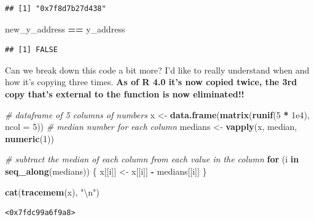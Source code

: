 \documentclass[]{book}
\newenvironment{Shaded}{\begin{snugshade}}{\end{snugshade}}
\newcommand{\CharTok}[1]{\textcolor[rgb]{0.31,0.60,0.02}{#1}}
\newcommand{\CommentTok}[1]{\textcolor[rgb]{0.56,0.35,0.01}{\textit{#1}}}
\newcommand{\ControlFlowTok}[1]{\textcolor[rgb]{0.13,0.29,0.53}{\textbf{#1}}}
\newcommand{\DataTypeTok}[1]{\textcolor[rgb]{0.13,0.29,0.53}{#1}}
\newcommand{\DecValTok}[1]{\textcolor[rgb]{0.00,0.00,0.81}{#1}}
\newcommand{\FloatTok}[1]{\textcolor[rgb]{0.00,0.00,0.81}{#1}}
\newcommand{\KeywordTok}[1]{\textcolor[rgb]{0.13,0.29,0.53}{\textbf{#1}}}
\newcommand{\NormalTok}[1]{#1}
\newcommand{\OperatorTok}[1]{\textcolor[rgb]{0.81,0.36,0.00}{\textbf{#1}}}
\newcommand{\StringTok}[1]{\textcolor[rgb]{0.31,0.60,0.02}{#1}}
\begin{document}
\begin{verbatim}
## [1] "0x7f8d7b27d438"
\end{verbatim}

\begin{Shaded}
\begin{Highlighting}[]
\NormalTok{new_y_address }\OperatorTok{==}\StringTok{ }\NormalTok{y_address}
\end{Highlighting}
\end{Shaded}

\begin{verbatim}
## [1] FALSE
\end{verbatim}

Can we break down this code a bit more? I'd like to really understand when and how it's copying three times. \textbf{As of R 4.0 it's now copied twice, the 3rd copy that's external to the function is now eliminated!!}

\begin{Shaded}
\begin{Highlighting}[]
\CommentTok{# dataframe of 5 columns of numbers}
\NormalTok{x <-}\StringTok{ }\KeywordTok{data.frame}\NormalTok{(}\KeywordTok{matrix}\NormalTok{(}\KeywordTok{runif}\NormalTok{(}\DecValTok{5} \OperatorTok{*}\StringTok{ }\FloatTok{1e4}\NormalTok{), }\DataTypeTok{ncol =} \DecValTok{5}\NormalTok{))}
\CommentTok{# median number for each column}
\NormalTok{medians <-}\StringTok{ }\KeywordTok{vapply}\NormalTok{(x, median, }\KeywordTok{numeric}\NormalTok{(}\DecValTok{1}\NormalTok{))}

\CommentTok{# subtract the median of each column from each value in the column}
\ControlFlowTok{for}\NormalTok{ (i }\ControlFlowTok{in} \KeywordTok{seq_along}\NormalTok{(medians)) \{}
\NormalTok{  x[[i]] <-}\StringTok{ }\NormalTok{x[[i]] }\OperatorTok{-}\StringTok{ }\NormalTok{medians[[i]]}
\NormalTok{\}}
\end{Highlighting}
\end{Shaded}

\begin{Shaded}
\begin{Highlighting}[]
\KeywordTok{cat}\NormalTok{(}\KeywordTok{tracemem}\NormalTok{(x), }\StringTok{"}\CharTok{\textbackslash{}n}\StringTok{"}\NormalTok{)}
\end{Highlighting}
\end{Shaded}

\begin{verbatim}
<0x7fdc99a6f9a8> 
\end{verbatim}
\end{document}

